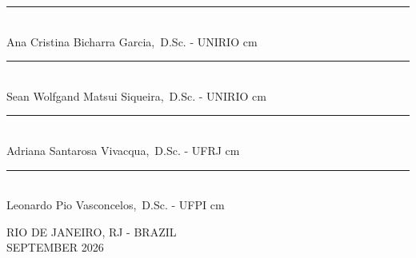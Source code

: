 \begin{flushright}
    \rule{11.0cm}{.1mm} \\
    Ana Cristina Bicharra Garcia,~D.Sc. - UNIRIO
     cm

    \rule{11.0cm}{.1mm}\\
    Sean Wolfgand Matsui Siqueira,~D.Sc. - UNIRIO
     cm

    \rule{11.0cm}{.1mm}\\
    Adriana Santarosa Vivacqua,~D.Sc. - UFRJ
     cm

    \rule{11.0cm}{.1mm}\\
    Leonardo Pio Vasconcelos,~D.Sc. - UFPI
     cm



    
    
    \vskip 0.75cm
    
\end{flushright}
\begin{center}
    RIO DE JANEIRO, RJ - BRAZIL \\ SEPTEMBER 2026
\end{center}
\thispagestyle{empty}
\newpage
